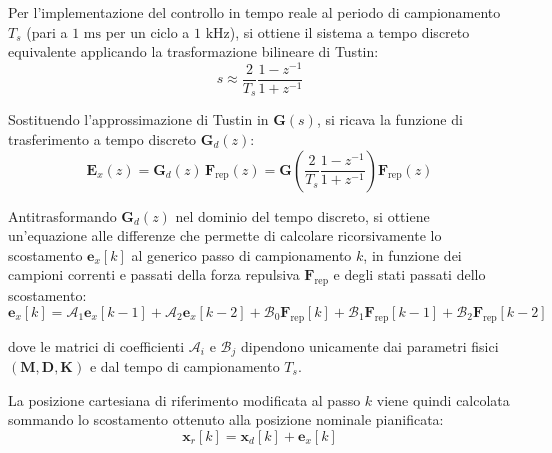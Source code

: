 Per l'implementazione del controllo in tempo reale al periodo di campionamento $T_s$ (pari a $1\text{ ms}$ per un ciclo a $1\text{ kHz}$), si ottiene il sistema a tempo discreto equivalente applicando la trasformazione bilineare di Tustin:
\begin{equation}
s \approx \frac{2}{T_s} \frac{1 - z^{-1}}{1 + z^{-1}}
\end{equation}

Sostituendo l'approssimazione di Tustin in $\boldsymbol{G}(s)$, si ricava la funzione di trasferimento a tempo discreto $\boldsymbol{G}_d(z)$:
\begin{equation}
\boldsymbol{E}_x(z) = \boldsymbol{G}_d(z) \, \boldsymbol{F}_{\text{rep}}(z) = \boldsymbol{G}\left( \frac{2}{T_s} \frac{1 - z^{-1}}{1 + z^{-1}} \right) \boldsymbol{F}_{\text{rep}}(z)
\end{equation}

Antitrasformando $\boldsymbol{G}_d(z)$ nel dominio del tempo discreto, si ottiene un'equazione alle differenze che permette di calcolare ricorsivamente lo scostamento $\boldsymbol{e}_x[k]$ al generico passo di campionamento $k$, in funzione dei campioni correnti e passati della forza repulsiva $\boldsymbol{F}_{\text{rep}}$ e degli stati passati dello scostamento:
\begin{equation}
\boldsymbol{e}_x[k] = \boldsymbol{\mathcal{A}}_1 \boldsymbol{e}_x[k-1] + \boldsymbol{\mathcal{A}}_2 \boldsymbol{e}_x[k-2] + \boldsymbol{\mathcal{B}}_0 \boldsymbol{F}_{\text{rep}}[k] + \boldsymbol{\mathcal{B}}_1 \boldsymbol{F}_{\text{rep}}[k-1] + \boldsymbol{\mathcal{B}}_2 \boldsymbol{F}_{\text{rep}}[k-2]
\end{equation}

dove le matrici di coefficienti $\boldsymbol{\mathcal{A}}_i$ e $\boldsymbol{\mathcal{B}}_j$ dipendono unicamente dai parametri fisici $(\boldsymbol{M}, \boldsymbol{D}, \boldsymbol{K})$ e dal tempo di campionamento $T_s$.

La posizione cartesiana di riferimento modificata al passo $k$ viene quindi calcolata sommando lo scostamento ottenuto alla posizione nominale pianificata:
\begin{equation}
\boldsymbol{x}_r[k] = \boldsymbol{x}_d[k] + \boldsymbol{e}_x[k]
\end{equation}

